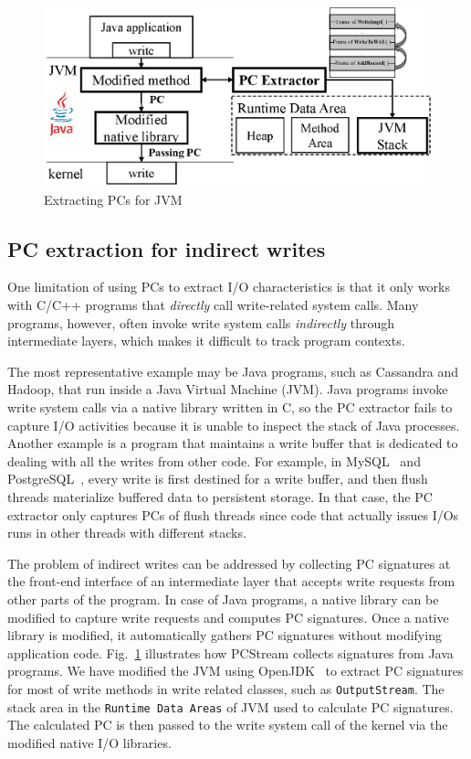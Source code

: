 \begin{figure}[t]
\centering
	\includegraphics[width=0.8\linewidth]{figure/jvmpc}
	\caption{
	Extracting PCs for JVM
	}
\label{fig:java}
\end{figure}


\subsection{PC extraction for indirect writes}
One limitation of using PCs to extract I/O characteristics is that it only
works with C/C++ programs that \textit{directly} call write-related system
calls.  Many programs, however, often invoke write system calls
\textit{indirectly} through intermediate layers, which makes it difficult to
track program contexts.

The most representative example may be Java programs, such as Cassandra and
Hadoop, that run inside a Java Virtual Machine (JVM). Java programs invoke
write system calls via a native library written in C, so the PC extractor fails
to capture I/O activities because it is unable to inspect the stack of Java
processes.  Another example is a program that maintains a write buffer that is
dedicated to dealing with all the writes from other code. For example, in
MySQL~\cite{MySQL} and PostgreSQL~\cite{PostgreSQL}, every write is first
destined for a write buffer, and then flush threads materialize buffered data
to persistent storage.  In that case, the PC extractor only captures PCs of
flush threads since code that actually issues I/Os runs in other threads with
different stacks.

The problem of indirect writes can be addressed by collecting PC signatures at
the front-end interface of an intermediate layer that accepts write requests
from other parts of the program. In case of Java programs, a native library can
be modified to capture write requests and computes PC signatures. Once a native
library is modified, it automatically gathers PC signatures without modifying
application code. Fig.~\ref{fig:java} illustrates how \textsf{PCStream}
collects signatures from Java programs.  We have modified the JVM using
OpenJDK~\cite{OpenJDK} to extract PC signatures for most of write methods in
write related classes, such as \texttt{OutputStream}.  The stack area in the
\texttt{Runtime Data Areas} of JVM used to calculate PC signatures.  The
calculated PC is then passed to the write system call of the kernel via the
modified native I/O libraries.

